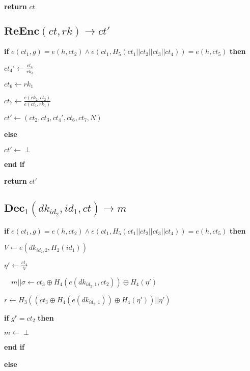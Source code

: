\documentclass[a4paper]{article}
\begin{document}
\textbf{return} $\textit{ct}$

\subsection{$\textbf{ReEnc}(\textit{ct}, \textit{rk}) \rightarrow \textit{ct}'$}

\textbf{if} $e(\textit{ct}_1, g) = e(h, \textit{ct}_2) \land e(\textit{ct}_1, H_5(\textit{ct}_1 || \textit{ct}_2 || \textit{ct}_3 || \textit{ct}_4)) = e(h, \textit{ct}_5)$ \textbf{then}

\quad$\textit{ct}_4' \gets \frac{\textit{ct}_4}{\textit{rk}_3}$

\quad$\textit{ct}_6 \gets \textit{rk}_1$

\quad$\textit{ct}_7 \gets \frac{e(\textit{rk}_2, \textit{ct}_2)}{e(\textit{ct}_1, \textit{rk}_1)}$

\quad$\textit{ct}' \gets (\textit{ct}_2, \textit{ct}_3, \textit{ct}_4', \textit{ct}_6, \textit{ct}_7, N)$

\textbf{else}

\quad$\textit{ct}' \gets \perp$

\textbf{end if}

\textbf{return} $\textit{ct}'$

\subsection{$\textbf{Dec}_1(\textit{dk}_{\textit{id}_2}, \textit{id}_1, \textit{ct}) \rightarrow m$}

\textbf{if} $e(\textit{ct}_1, g) = e(h, \textit{ct}_2) \land e(\textit{ct}_1, H_5(\textit{ct}_1 || \textit{ct}_2 || \textit{ct}_3 || \textit{ct}_4)) = e(h, \textit{ct}_5)$ \textbf{then}

\quad$V \gets e(\textit{dk}_{\textit{id}_2, 2}, H_2(\textit{id}_1))$

\quad$\eta' \gets \frac{\textit{ct}_4}{V}$

$\quad m || \sigma \gets \textit{ct}_3 \oplus H_4(e(\textit{dk}_{\textit{id}_2, 1}, \textit{ct}_2)) \oplus H_4(\eta')$

\quad$r \gets H_3((\textit{ct}_3 \oplus H_4(e(\textit{dk}_{\textit{id}_2, 1})) \oplus H_4(\eta')) || \eta')$

\quad\textbf{if} $g^r = \textit{ct}_2$ \textbf{then}

\quad\quad$m \gets \perp$

\quad\textbf{end if}

\textbf{else}
\end{document}
